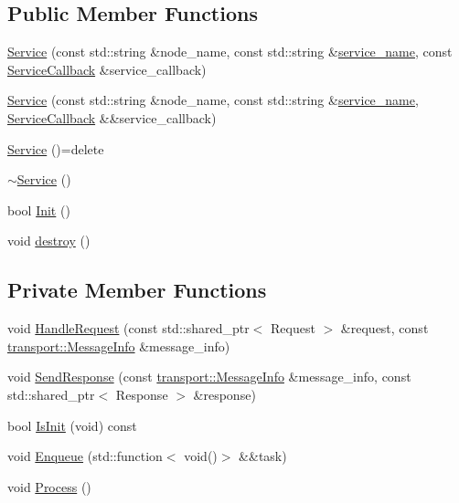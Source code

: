 \subsection*{Public Member Functions}
\begin{DoxyCompactItemize}
\item 
\hyperlink{classapollo_1_1cyber_1_1Service_a564ad60a164abebb94329d9542e84aec}{Service} (const std\-::string \&node\-\_\-name, const std\-::string \&\hyperlink{classapollo_1_1cyber_1_1ServiceBase_af50ffeb173dc4e7b5410af9f74fdfe5b}{service\-\_\-name}, const \hyperlink{classapollo_1_1cyber_1_1Service_aedd53fb1d4b3636253ddcaba4dc896ab}{Service\-Callback} \&service\-\_\-callback)
\item 
\hyperlink{classapollo_1_1cyber_1_1Service_a616f1abb7686a6ba5af0dfd1e5d920f9}{Service} (const std\-::string \&node\-\_\-name, const std\-::string \&\hyperlink{classapollo_1_1cyber_1_1ServiceBase_af50ffeb173dc4e7b5410af9f74fdfe5b}{service\-\_\-name}, \hyperlink{classapollo_1_1cyber_1_1Service_aedd53fb1d4b3636253ddcaba4dc896ab}{Service\-Callback} \&\&service\-\_\-callback)
\item 
\hyperlink{classapollo_1_1cyber_1_1Service_aea802e52a8799ad566e779b48c0bd75b}{Service} ()=delete
\item 
\hyperlink{classapollo_1_1cyber_1_1Service_a24ff23a2c3f10481a6ee46bb0e7f2205}{$\sim$\-Service} ()
\item 
bool \hyperlink{classapollo_1_1cyber_1_1Service_a611e7a31ce9b5d3700af21b13871a3cf}{Init} ()
\item 
void \hyperlink{classapollo_1_1cyber_1_1Service_aeaaef735425d56ab7879e1597587c081}{destroy} ()
\end{DoxyCompactItemize}
\subsection*{Private Member Functions}
\begin{DoxyCompactItemize}
\item 
void \hyperlink{classapollo_1_1cyber_1_1Service_a9ed0b62384d23ed246fca4e82f3dbe7d}{Handle\-Request} (const std\-::shared\-\_\-ptr$<$ Request $>$ \&request, const \hyperlink{classapollo_1_1cyber_1_1transport_1_1MessageInfo}{transport\-::\-Message\-Info} \&message\-\_\-info)
\item 
void \hyperlink{classapollo_1_1cyber_1_1Service_a556f3fcb7d37e683a39fa37a4434900a}{Send\-Response} (const \hyperlink{classapollo_1_1cyber_1_1transport_1_1MessageInfo}{transport\-::\-Message\-Info} \&message\-\_\-info, const std\-::shared\-\_\-ptr$<$ Response $>$ \&response)
\item 
bool \hyperlink{classapollo_1_1cyber_1_1Service_a88afc38e23bac7241ed705c7243d2ac4}{Is\-Init} (void) const 
\item 
void \hyperlink{classapollo_1_1cyber_1_1Service_a86c5f12fdebf8f61f059bfcfc29df859}{Enqueue} (std\-::function$<$ void()$>$ \&\&task)
\item 
void \hyperlink{classapollo_1_1cyber_1_1Service_a7f85a4c126c0668d00da561ac372c450}{Process} ()
\end{DoxyCompactItemize}
